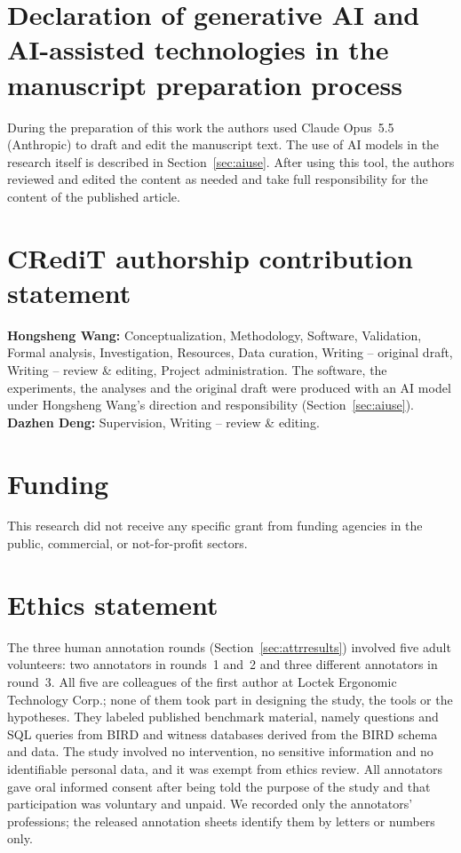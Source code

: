 \documentclass[preprint,12pt]{elsarticle}
\begin{document}
\section*{Declaration of generative AI and AI-assisted technologies in the manuscript preparation process}
During the preparation of this work the authors used Claude Opus~5.5 (Anthropic) to draft and edit the manuscript text. The use of AI models in the research itself is described in Section~\ref{sec:aiuse}. After using this tool, the authors reviewed and edited the content as needed and take full responsibility for the content of the published article.

\section*{CRediT authorship contribution statement}
\textbf{Hongsheng Wang:} Conceptualization, Methodology, Software, Validation, Formal analysis, Investigation, Resources, Data curation, Writing -- original draft, Writing -- review \& editing, Project administration. The software, the experiments, the analyses and the original draft were produced with an AI model under Hongsheng Wang's direction and responsibility (Section~\ref{sec:aiuse}). \textbf{Dazhen Deng:} Supervision, Writing -- review \& editing.


\section*{Funding}
This research did not receive any specific grant from funding agencies in the public, commercial, or not-for-profit sectors.

\section*{Ethics statement}
The three human annotation rounds (Section~\ref{sec:attrresults}) involved five adult volunteers: two annotators in rounds~1 and~2 and three different annotators in round~3. All five are colleagues of the first author at Loctek Ergonomic Technology Corp.; none of them took part in designing the study, the tools or the hypotheses. They labeled published benchmark material, namely questions and SQL queries from BIRD and witness databases derived from the BIRD schema and data. The study involved no intervention, no sensitive information and no identifiable personal data, and it was exempt from ethics review. All annotators gave oral informed consent after being told the purpose of the study and that participation was voluntary and unpaid. We recorded only the annotators' professions; the released annotation sheets identify them by letters or numbers only.
\end{document}
